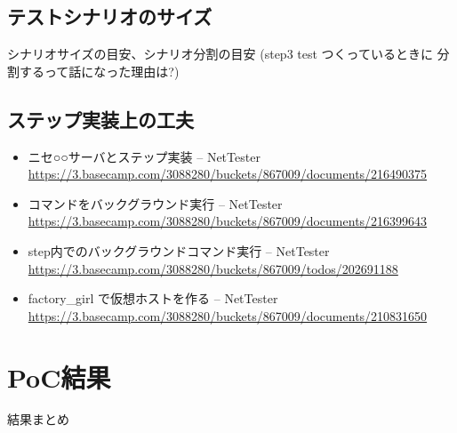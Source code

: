 \subsection{テストシナリオのサイズ}

シナリオサイズの目安、シナリオ分割の目安 (step3 test つくっているときに
分割するって話になった理由は?)

\subsection{ステップ実装上の工夫}
\begin{itemize}
 \item ニセ○○サーバとステップ実装 – NetTester \url{https://3.basecamp.com/3088280/buckets/867009/documents/216490375}
 \item コマンドをバックグラウンド実行 – NetTester \url{https://3.basecamp.com/3088280/buckets/867009/documents/216399643}
 \item step内でのバックグラウンドコマンド実行 – NetTester \url{https://3.basecamp.com/3088280/buckets/867009/todos/202691188}
 \item factory\_girl で仮想ホストを作る – NetTester \url{https://3.basecamp.com/3088280/buckets/867009/documents/210831650}
\end{itemize}

\section{PoC結果}

結果まとめ


